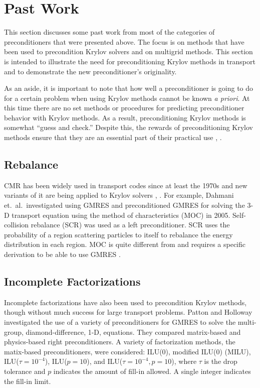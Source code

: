 \section{Past Work}
This section discusses some past work from most of the categories of preconditioners that were presented above. The focus is on methods that have been used to precondition Krylov solvers and on multigrid methods. This section is intended to illustrate the need for preconditioning Krylov methods in transport and to demonstrate the new preconditioner's originality. 

As an aside, it is important to note that how well a preconditioner is going to do for a certain problem when using Krylov methods cannot be known \emph{a priori}. At this time there are no set methods or procedures for predicting preconditioner behavior with Krylov methods. As a result, preconditioning Krylov methods is somewhat ``guess and check.'' Despite this, the rewards of preconditioning Krylov methods ensure that they are an essential part of their practical use \cite{Knoll2004}, \cite{Benzi2002}. 

\subsection{Rebalance}
CMR has been widely used in transport codes since at least the 1970s and new variants of it are being applied to Krylov solvers \cite{Dahmani2002}, \cite{Yamamoto2005}. For example, Dahmani et.\ al.\ investigated using GMRES and preconditioned GMRES for solving the 3-D transport equation using the method of characteristics (MOC) in 2005. Self-collision rebalance (SCR) was used as a left preconditioner. SCR uses the probability of a region scattering particles to itself to rebalance the energy distribution in each region. MOC is quite different from \Sn and requires a specific derivation to be able to use GMRES \cite{Dahmani2002}. 

\subsection{Incomplete Factorizations}
Incomplete factorizations have also been used to precondition Krylov methods, though without much success for large transport problems. Patton and Holloway investigated the use of a variety of preconditioners for GMRES to solve the multi-group, diamond-difference, 1-D, \Sn equations. They compared matrix-based and physics-based right preconditioners. A variety of factorization methods, the matix-based preconditioners, were considered: ILU(0), modified ILU(0) (MILU), ILU($\tau=10^{-4}$), ILU($p=10$), and ILU($\tau=10^{-4}, p=10$), where $\tau$ is the drop tolerance and $p$ indicates the amount of fill-in allowed. A single integer indicates the fill-in limit. 

